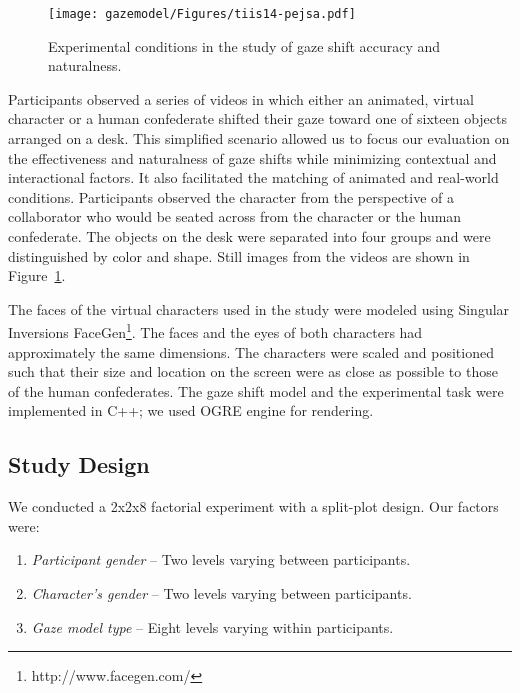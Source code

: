\begin{figure}
  \centering
  \texttt{[image: gazemodel/Figures/tiis14-pejsa.pdf]}
  \caption{Experimental conditions in the study of gaze shift accuracy and naturalness.}
  \label{fig:ModelEvalSetup}
\end{figure}

Participants observed a series of videos in which either an animated, virtual character or a human confederate shifted their gaze toward one of sixteen objects arranged on a desk. This simplified scenario allowed us to focus our evaluation on the effectiveness and naturalness of gaze shifts while minimizing contextual and interactional factors. It also facilitated the matching of animated and real-world conditions. Participants observed the character from the perspective of a collaborator who would be seated across from the character or the human confederate. The objects on the desk were separated into four groups and were distinguished by color and shape. Still images from the videos are shown in Figure~\ref{fig:ModelEvalSetup}.

The faces of the virtual characters used in the study were modeled using Singular Inversions FaceGen\footnote{http://www.facegen.com/}. The faces and the eyes of both characters had approximately the same dimensions. The characters were scaled and positioned such that their size and location on the screen were as close as possible to those of the human confederates. The gaze shift model and the experimental task were implemented in C++; we used OGRE engine for rendering.

\subsection{Study Design}

We conducted a 2x2x8 factorial experiment with a split-plot design. Our factors were:

\begin{enumerate}
\item \emph{Participant gender} -- Two levels varying between participants.
\item \emph{Character's gender} -- Two levels varying between participants.
\item \emph{Gaze model type} -- Eight levels varying within participants.
\end{enumerate}

